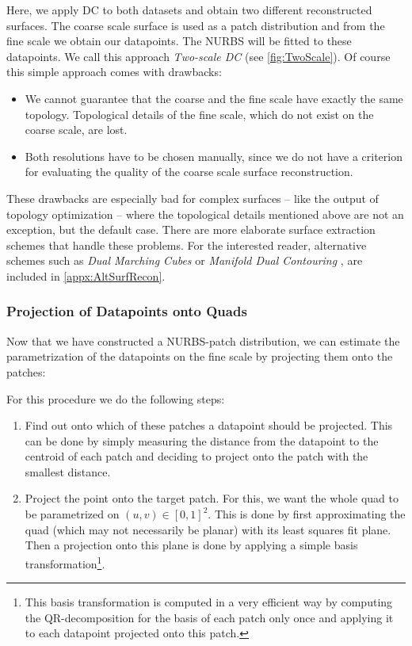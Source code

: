 Here, we apply \ac{DC} to both datasets and obtain two different reconstructed surfaces.
The coarse scale surface is used as a patch distribution and from the fine scale we obtain our datapoints. The \ac{NURBS} will be fitted to these datapoints. We call this approach \emph{Two-scale \acl{DC}} (see \autoref{fig:TwoScale}).
Of course this simple approach comes with drawbacks:
\begin{itemize}
\item We cannot guarantee that the coarse and the fine scale have exactly the same topology. Topological details of the fine scale, which do not exist on the coarse scale, are lost.
\item Both resolutions have to be chosen manually, since we do not have a criterion for evaluating the quality of the coarse scale surface reconstruction.
\end{itemize}
These drawbacks are especially bad for complex surfaces -- like the output of topology optimization -- where the topological details mentioned above are not an exception, but the default case. There are more elaborate surface extraction schemes that handle these problems. For the interested reader, alternative schemes such as \emph{Dual Marching Cubes} \cite{ScottSchaefer2004} or \emph{Manifold Dual Contouring} \cite{Schaefer2007}, are included in \autoref{appx:AltSurfRecon}.
\subsubsection{Projection of Datapoints onto Quads}
\label{sssec:projection}
Now that we have constructed a \ac{NURBS}-patch distribution, we can estimate the parametrization of the datapoints on the fine scale by projecting them onto the patches: 

For this procedure we do the following steps:

\begin{enumerate}
\item Find out onto which of these patches a datapoint should be projected. This can be done by simply measuring the distance from the datapoint to the centroid of each patch and deciding to project onto the patch with the smallest distance.
\item Project the point onto the target patch. For this, we want the whole \ac{quad} to be parametrized on $\left(u,v\right)\in\left[0,1\right]^2$. This is done by first approximating the quad (which may not necessarily be planar) with its least squares fit plane. Then a projection onto this plane is done by applying a simple basis transformation\footnote{This basis transformation is computed in a very efficient way by computing the QR-decomposition for the basis of each patch only once and applying it to each datapoint projected onto this patch.}.
\end{enumerate}

